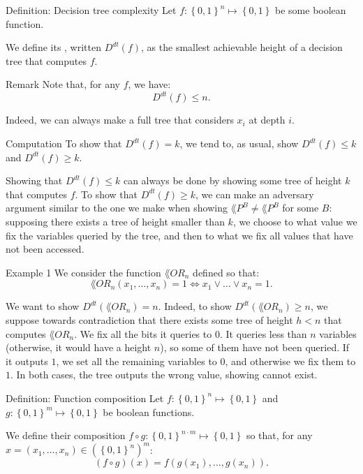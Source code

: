 \documentclass[a4paper]{article}
\begin{document}
\begin{parag}{Definition: Decision tree complexity}
    Let $f: \left\{0, 1\right\}^n \mapsto \left\{0, 1\right\}$ be some boolean function.

    We define its , written $D^{dt}\left(f\right)$, as the smallest achievable height of a decision tree that computes $f$.

    \begin{subparag}{Remark}
        Note that, for any $f$, we have: 
        \[D^{dt}\left(f\right) \leq n.\]

        Indeed, we can always make a full tree that considers $x_i$ at depth $i$.
    \end{subparag}
    
    \begin{subparag}{Computation}
        To show that $D^{dt}\left(f\right) = k$, we tend to, as usual, show $D^{dt}\left(f\right) \leq k$ and $D^{dt}\left(f\right) \geq k$.

        Showing that $D^{dt}\left(f\right) \leq k$ can always be done by showing some tree of height $k$ that computes $f$. To show that $D^{dt}\left(f\right) \geq k$, we can make an adversary argument similar to the one we make when showing $\lang{P}^B \neq \lang{P}^B$ for some $B$: supposing there exists a tree of height smaller than $k$, we choose to what value we fix the variables queried by the tree, and then to what we fix all values that have not been accessed.
    \end{subparag}
\end{parag}

\begin{parag}{Example 1}
    We consider the function $\lang{OR}_n$ defined so that: 
    \[\lang{OR}_n\left(x_1, \ldots, x_n\right) = 1 \iff x_1 \lor \ldots \lor x_n = 1.\]
    
    We want to show $D^{dt}\left(\lang{OR}_n\right) = n$. Indeed, to show $D^{dt}\left(\lang{OR}_n\right) \geq n$, we suppose towards contradiction that there exists some tree of height $h < n$ that computes $\lang{OR}_n$. We fix all the bits it queries to $0$. It queries less than $n$ variables (otherwise, it would have a height $n$), so some of them have not been queried. If it outputs $1$, we set all the remaining variables to $0$, and otherwise we fix them to $1$. In both cases, the tree outputs the wrong value, showing cannot exist.
\end{parag}

\begin{parag}{Definition: Function composition}
    Let $f: \left\{0, 1\right\}^n \mapsto \left\{0, 1\right\}$ and $g: \left\{0, 1\right\}^m \mapsto \left\{0, 1\right\}$ be boolean functions.

    We define their composition $f\circ g: \left\{0, 1\right\}^{n\cdot m} \mapsto \left\{0, 1\right\}$ so that, for any $x = \left(x_1, \ldots, x_n\right) \in \left(\left\{0, 1\right\}^n\right)^m$: 
    \[\left(f \circ g\right)\left(x\right) = f\left(g\left(x_1\right), \ldots, g\left(x_n\right)\right).\]
\end{parag}
\end{document}
